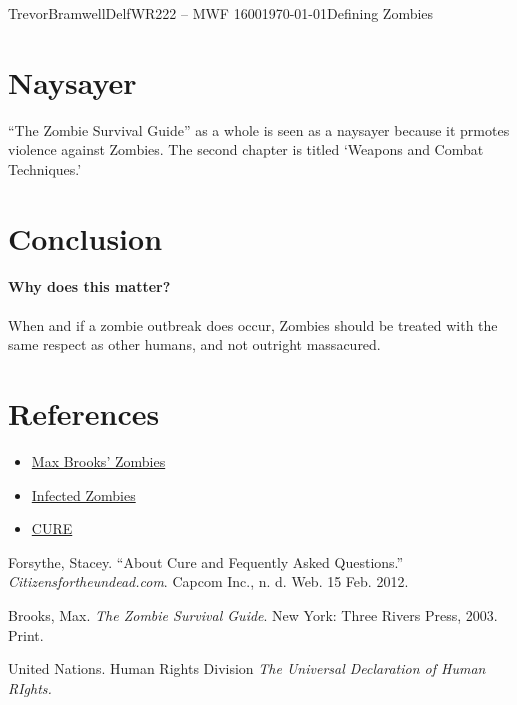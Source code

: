 \documentclass[12pt,letterpaper]{article}
\begin{document}
\begin{mla}{Trevor}{Bramwell}{Delf}{WR222 -- MWF 1600}{\today}{Defining Zombies}
\section*{Naysayer}
``The Zombie Survival Guide'' as a whole is seen as a naysayer because it
prmotes violence against Zombies. The second chapter is titled `Weapons and
Combat Techniques.'
\section*{Conclusion}
\paragraph{Why does this matter?}
When and if a zombie outbreak does occur, Zombies should be treated with the
same respect as other humans, and not outright massacured. 
\section*{References}
\begin{itemize}
\item
\href{http://zombie.wikia.com/wiki/Zombies\_(Max\_Brooks)}{Max Brooks' Zombies}
\item
\href{http://zombie.wikia.com/wiki/Infected}{Infected Zombies}
\item
\href{http://www.citizensfortheundead.com/about.html}{CURE}
\end{itemize}

\begin{workscited}
\bibent
Forsythe, Stacey. ``About Cure and Fequently Asked Questions.'' \emph{Citizensfortheundead.com}. Capcom Inc., n. d. Web. 15 Feb. 2012.

\bibent
Brooks, Max. \emph{The Zombie Survival Guide}. New York: Three Rivers Press,
2003. Print.

\bibent
United Nations. Human Rights Division \emph{The Universal Declaration of Human RIghts.} 
\end{workscited}
\end{mla}
\end{document}
